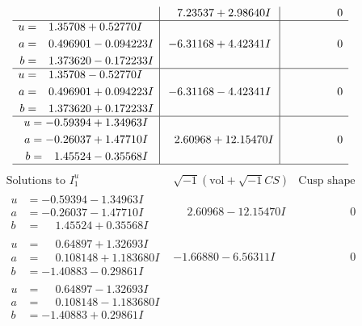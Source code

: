 \documentclass[1p]{elsarticle_modified}
\theoremstyle{definition}
\newcommand{\I}{\sqrt{-1}}
\begin{document}
$$\begin{array}{c|c|c}
 & \phantom{-}7.23537 + 2.98640 I & \phantom{-0.000000 } 0 \\ \hline\begin{aligned}
u &= \phantom{-}1.35708 + 0.52770 I \\
a &= \phantom{-}0.496901 - 0.094223 I \\
b &= \phantom{-}1.373620 - 0.172233 I\end{aligned}
 & -6.31168 + 4.42341 I & \phantom{-0.000000 } 0 \\ \hline\begin{aligned}
u &= \phantom{-}1.35708 - 0.52770 I \\
a &= \phantom{-}0.496901 + 0.094223 I \\
b &= \phantom{-}1.373620 + 0.172233 I\end{aligned}
 & -6.31168 - 4.42341 I & \phantom{-0.000000 } 0 \\ \hline\begin{aligned}
u &= -0.59394 + 1.34963 I \\
a &= -0.26037 + 1.47710 I \\
b &= \phantom{-}1.45524 - 0.35568 I\end{aligned}
 & \phantom{-}2.60968 + 12.15470 I & \phantom{-0.000000 } 0\\
 \hline 
 \end{array}$$\newpage$$\begin{array}{c|c|c}  
\text{Solutions to }I^u_{1}& \I (\text{vol} + \sqrt{-1}CS) & \text{Cusp shape}\\
 \hline 
\begin{aligned}
u &= -0.59394 - 1.34963 I \\
a &= -0.26037 - 1.47710 I \\
b &= \phantom{-}1.45524 + 0.35568 I\end{aligned}
 & \phantom{-}2.60968 - 12.15470 I & \phantom{-0.000000 } 0 \\ \hline\begin{aligned}
u &= \phantom{-}0.64897 + 1.32693 I \\
a &= \phantom{-}0.108148 + 1.183680 I \\
b &= -1.40883 - 0.29861 I\end{aligned}
 & -1.66880 - 6.56311 I & \phantom{-0.000000 } 0 \\ \hline\begin{aligned}
u &= \phantom{-}0.64897 - 1.32693 I \\
a &= \phantom{-}0.108148 - 1.183680 I \\
b &= -1.40883 + 0.29861 I\end{aligned}

\end{array}$$
\end{document}
